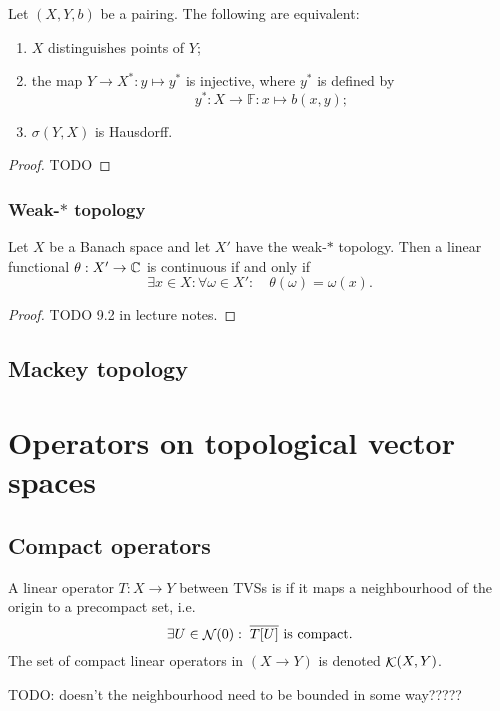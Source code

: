\begin{proposition}
Let $(X,Y,b)$ be a pairing. The following are equivalent:
\begin{enumerate}
\item $X$ distinguishes points of $Y$;
\item the map $Y\to X^*: y\mapsto y^*$ is injective, where $y^*$ is defined by
\[ y^*: X\to \mathbb{F}: x\mapsto b(x,y); \]
\item $\sigma(Y,X)$ is Hausdorff.
\end{enumerate}
\end{proposition}
\begin{proof}
TODO
\end{proof}

\subsubsection{Weak-$*$ topology}

\begin{proposition} \label{prop:weak*continuousFunctional}
Let $X$ be a Banach space and let $X'$ have the weak-$*$ topology. Then a linear functional $\theta: X'\to \mathbb{C}$ is continuous \textup{if and only if}
\[ \exists x\in X: \forall \omega\in X': \quad \theta(\omega) = \omega(x). \]
\end{proposition}
\begin{proof}
TODO 9.2 in lecture notes.
\end{proof}

\subsection{Mackey topology}

\begin{theorem}
\end{theorem}

\section{Operators on topological vector spaces}
\subsection{Compact operators}
\begin{definition}
A linear operator $T:X\to Y$ between TVSs is  if it maps a neighbourhood of the origin to a precompact set, i.e. 
\[ \exists U \in \mathop{\mathcal{N}}(0): \;  \text{$\overline{T[U]}$ is compact.} \]
The set of compact linear operators in $(X\to Y)$ is denoted $\mathop{\mathcal{K}}(X,Y)$.
\end{definition}
TODO: doesn't the neighbourhood need to be bounded in some way?????

